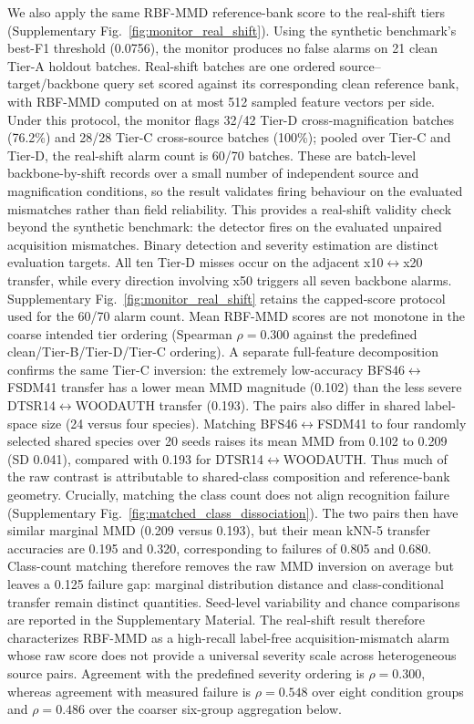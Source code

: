 \documentclass[a4paper,fleqn]{els-cas-templates/cas-sc}
\begin{document}
We also apply the same RBF-MMD reference-bank score to the real-shift tiers
(Supplementary Fig.~\ref{fig:monitor_real_shift}). Using the synthetic benchmark's best-F1
threshold (0.0756), the monitor produces no false alarms on 21 clean Tier-A
holdout batches. Real-shift batches are one ordered source--target/backbone
query set scored against its corresponding clean reference bank, with RBF-MMD
computed on at most 512 sampled feature vectors per side. Under this protocol,
the monitor flags 32/42 Tier-D cross-magnification batches (76.2\%) and 28/28
Tier-C cross-source batches (100\%); pooled over Tier-C and Tier-D, the
real-shift alarm count is 60/70 batches. These are batch-level
backbone-by-shift records over a small number of independent source and
magnification conditions, so the result validates firing behaviour on the
evaluated mismatches rather than field reliability. This provides a real-shift
validity check beyond the synthetic benchmark: the detector fires on the
evaluated unpaired acquisition mismatches. Binary detection and severity estimation are
distinct evaluation targets. All ten Tier-D misses occur on the adjacent
x10$\leftrightarrow$x20 transfer, while every direction involving x50 triggers
all seven backbone alarms. Supplementary Fig.~\ref{fig:monitor_real_shift}
retains the capped-score protocol used for the 60/70 alarm count. Mean
RBF-MMD scores are not monotone in the coarse intended tier ordering
(Spearman $\rho=0.300$ against the predefined clean/Tier-B/Tier-D/Tier-C
ordering). A separate full-feature decomposition confirms the same Tier-C
inversion: the extremely low-accuracy BFS46$\leftrightarrow$FSDM41 transfer has
a lower mean MMD magnitude (0.102) than the less severe
DTSR14$\leftrightarrow$WOODAUTH transfer (0.193).
The pairs also differ in shared label-space size (24 versus four species).
Matching BFS46$\leftrightarrow$FSDM41 to four randomly selected shared species
over 20 seeds raises its mean MMD from 0.102 to 0.209
(SD 0.041), compared with 0.193 for
DTSR14$\leftrightarrow$WOODAUTH. Thus much of the raw contrast is attributable
to shared-class composition and reference-bank geometry.
Crucially, matching the class count does not align recognition failure
(Supplementary Fig.~\ref{fig:matched_class_dissociation}). The two pairs then
have similar marginal MMD (0.209 versus 0.193), but their mean kNN-5 transfer
accuracies are 0.195 and 0.320, corresponding to failures of 0.805 and 0.680.
Class-count matching therefore removes the raw MMD inversion on average but
leaves a 0.125 failure gap: marginal distribution distance and
class-conditional transfer remain distinct quantities. Seed-level variability
and chance comparisons are reported in the Supplementary Material.
The real-shift result therefore characterizes RBF-MMD as a high-recall
label-free acquisition-mismatch alarm whose raw score does not provide a
universal severity scale across heterogeneous source pairs. Agreement with the
predefined severity ordering is $\rho=0.300$, whereas agreement with measured
failure is
$\rho=0.548$ over eight condition groups and $\rho=0.486$ over the coarser
six-group aggregation below.
\end{document}
